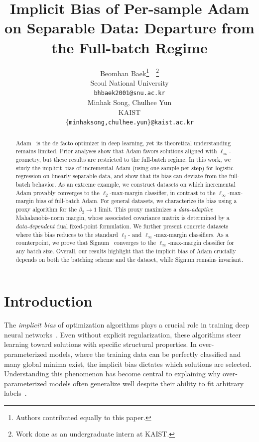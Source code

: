 \documentclass{article} %
\title{Implicit Bias of Per-sample Adam on Separable Data: Departure from the Full-batch Regime}
\author{Beomhan Baek\thanks{Authors contributed equally to this paper.}~~\thanks{Work done as an undergraduate intern at KAIST.} \\
Seoul National University \\
\texttt{bhbaek2001@snu.ac.kr} \\
\And
Minhak Song\footnotemark[1],\; Chulhee Yun\\
KAIST \\
\texttt{\{minhaksong,chulhee.yun\}@kaist.ac.kr}
}
\theoremstyle{plain}
\theoremstyle{definition}
\theoremstyle{remark}
\begin{document}
\maketitle

\begin{abstract}
Adam~\citep{kingma2014adam} is the de facto optimizer in deep learning, yet its theoretical understanding remains limited. Prior analyses show that Adam favors solutions aligned with $\ell_\infty$-geometry, but these results are restricted to the full-batch regime. In this work, we study the implicit bias of incremental Adam (using one sample per step) for logistic regression on linearly separable data, and show that its bias can deviate from the full-batch behavior. As an extreme example, we construct datasets on which incremental Adam provably converges to the $\ell_2$-max-margin classifier, in contrast to the $\ell_\infty$-max-margin bias of full-batch Adam. For general datasets, we characterize its bias using a proxy algorithm for the $\beta_2 \to 1$ limit. This proxy maximizes a \emph{data-adaptive} Mahalanobis-norm margin, whose associated covariance matrix is determined by a \emph{data-dependent} dual fixed-point formulation. We further present concrete datasets where this bias reduces to the standard $\ell_2$- and $\ell_\infty$-max-margin classifiers. As a counterpoint, we prove that Signum~\citep{bernstein2018sign} converges to the $\ell_\infty$-max-margin classifier for any batch size. Overall, our results highlight that the implicit bias of Adam crucially depends on both the batching scheme and the dataset, while Signum remains invariant.
\end{abstract}


\section{Introduction}


The \emph{implicit bias} of optimization algorithms plays a crucial role in training deep neural networks~\citep{vardi2023on}. Even without explicit regularization, these algorithms steer learning toward solutions with specific structural properties. In over-parameterized models, where the training data can be perfectly classified and many global minima exist, the implicit bias dictates which solutions are selected. Understanding this phenomenon has become central to explaining why over-parameterized models often generalize well despite their ability to fit arbitrary labels~\citep{zhang2017understanding}.
\end{document}
